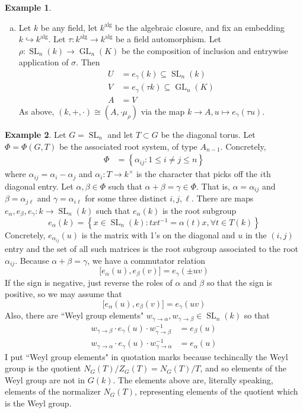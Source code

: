 \documentclass[12pt]{article}
\theoremstyle{definition}
\newtheorem{example}{Example}
\newcommand{\sig}{\sigma}
\newcommand{\lb}{\left\{}
\newcommand{\rb}{\right\}}
\newcommand{\inv}{^{-1}}
\newcommand{\into}{\hookrightarrow}
\newcommand{\iso}{\cong}
\DeclareMathOperator{\SL}{SL}
\DeclareMathOperator{\GL}{GL}
\DeclareMathOperator{\alg}{alg}
\begin{document}
\begin{example}
\begin{enumerate}[(a)]
\item Let $k$ be any field, let $k^{\alg}$ be the algebraic closure, and fix an embedding $k \into k^{\alg}$. Let $\tau:k^{\alg} \to k^{\alg}$ be a field automorphism. Let $\rho:\SL_n(k) \to \GL_n(K)$ be the composition of inclusion and entrywise application of $\sig$. Then
\begin{align*}
	U &= e_\gamma(k) \subseteq \SL_n(k) \\
	V &= e_\gamma(\tau k) \subseteq \GL_n(K) \\
	A &= V
\end{align*}
As above, $(k, +, \cdot) \iso (A, \cdot \mu_\rho)$ via the map $k \to A, u \mapsto e_\gamma(\tau u)$.
\end{enumerate}
\end{example}

\begin{example}
Let $G = \SL_n$ and let $T \subset G$ be the diagonal torus. Let $\Phi = \Phi(G, T)$ be the associated root system, of type $A_{n-1}$. Concretely,
\begin{align*}
	\Phi &= \lb \alpha_{ij} : 1 \le i \neq j \le n \rb 
\end{align*}
where $\alpha_{ij} = \alpha_i - \alpha_j$ and $\alpha_i:T \to k^\times$ is the character that picks off the $i$th diagonal entry. Let $\alpha, \beta \in \Phi$ such that $\alpha+\beta = \gamma \in \Phi$. That is, $\alpha = \alpha_{ij}$ and $\beta = \alpha_{j\ell}$ and $\gamma = \alpha_{i\ell}$ for some three distinct $i,j,\ell$. There are maps $e_\alpha, e_\beta, e_\gamma:k \to \SL_n(k)$ such that $e_\alpha(k)$ is the root subgroup 
\[
	e_\alpha(k) = \lb x \in \SL_n(k) : txt \inv = \alpha(t) x, \forall t \in T(k) \rb
\]
Concretely, $e_{\alpha_{ij}}(u)$ is the matrix with 1's on the diagonal and $u$ in the $(i,j)$ entry and the set of all such matrices is the root subgroup associated to the root $\alpha_{ij}$. Because $\alpha + \beta = \gamma$, we have a commutator relation
\[
	\Big[ e_\alpha(u), e_\beta(v) \Big] = e_\gamma( \pm uv )
\]
If the sign is negative, just reverse the roles of $\alpha$ and $\beta$ so that the sign is positive, so we may assume that
\[
	\Big[ e_\alpha(u), e_\beta(v) \Big] = e_\gamma( uv )
\]
Also, there are ``Weyl group elements" $w_{\gamma \to \alpha}, w_{\gamma \to \beta} \in \SL_n(k)$ so that
\begin{align*}
	w_{\gamma \to \beta} \cdot e_\gamma(u) \cdot w_{\gamma \to \beta} \inv &= e_\beta(u) \\
	w_{\gamma \to \alpha} \cdot e_\gamma(u) \cdot w_{\gamma \to \alpha} \inv &= e_\alpha(u)
\end{align*}
I put ``Weyl group elements" in quotation marks because techincally the Weyl group is the quotient $N_G(T)/ Z_G(T) = N_G(T)/T$, and so elements of the Weyl group are not in $G(k)$. The elements above are, literally speaking, elements of the normalizer $N_G(T)$, representing elements of the quotient which is the Weyl group.
\end{example}
\end{document}
